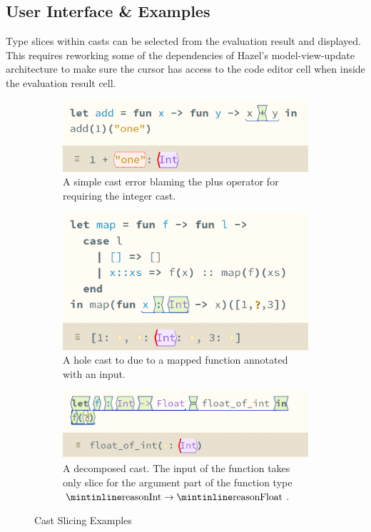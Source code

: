 \subsection{User Interface \& Examples}
Type slices within casts can be selected from the evaluation result and displayed. This requires reworking some of the dependencies of Hazel's model-view-update architecture to make sure the cursor has access to the code editor cell when inside the evaluation result cell.
\begin{figure}[h]
\centering
\begin{subfigure}{0.45\textwidth}
\centering
\includegraphics[width=1\textwidth]{Media/Figures/simple_cast_error}
\caption{A simple cast error blaming the plus operator for requiring the integer cast.}
\end{subfigure}
\begin{subfigure}{0.45\textwidth}
\centering
\includegraphics[width=1\textwidth]{Media/Figures/map_cast}
\caption{A hole cast to  due to a mapped function annotated with an  input.}
\end{subfigure}
\begin{subfigure}{0.65\textwidth}
\centering
\includegraphics[width=1\textwidth]{Media/Figures/decompose_casts}
\caption{A decomposed cast. The input of the function takes only slice for the argument part  of the function type $\code{Int} \to \code{Float}$.}
\end{subfigure}
\caption{Cast Slicing Examples}
\end{figure}
